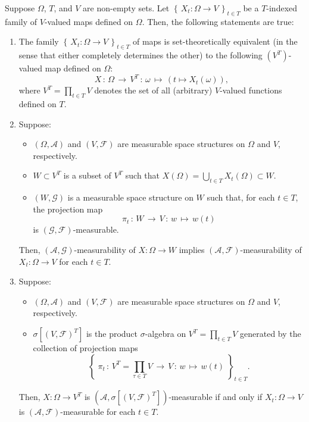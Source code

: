 \begin{theorem}
\mbox{}\vskip 0.1cm
\noindent
Suppose $\Omega$, $T$, and $V$ are non-empty sets.
Let $\left\{\,X_{t} : \Omega \longrightarrow V \,\right\}_{t \in T}$
be a $T$-indexed family of $V$-valued maps defined on $\Omega$.
Then, the following statements are true:
\begin{enumerate}
\item	The family $\left\{\,X_{t} : \Omega \longrightarrow V \,\right\}_{t \in T}$
		of maps is set-theoretically equivalent (in the sense that either completely determines the other)
		to the following $(V^{T})$-valued map defined on $\Omega$:
		\begin{equation*}
		X \,:\, \Omega \,\longrightarrow\, V^{T} \,:\, \omega \,\longmapsto\, \left(t \longmapsto X_{t}(\omega)\right),
		\end{equation*}
		where $V^{T} = \prod_{t\in T}V$ denotes the set of all (arbitrary) $V$-valued functions defined on $T$.
\item	Suppose:
		\begin{itemize}
		\item $\left(\Omega,\mathcal{A}\right)$ and $\left(V,\mathcal{F}\right)$
			are measurable space structures on $\Omega$ and $V$, respectively.
		\item $W \subset V^{T}$ is a subset of $V^{T}$
			such that $X(\Omega) = \bigcup_{t \in T}X_{t}(\Omega) \subset W$.
		\item $\left(W,\mathcal{G}\right)$ is a measurable space structure on $W$
			such that, for each $t \in T$, the projection map
			\begin{equation*}
			\pi_{t} \,:\, W \,\longrightarrow\, V \,:\, w \,\longmapsto\, w(t)
			\end{equation*}
			is $\left(\mathcal{G},\mathcal{F}\right)$-measurable.
		\end{itemize}
		Then, $\left(\mathcal{A},\mathcal{G}\right)$-measurability of $X : \Omega \longrightarrow W$
		implies
		$(\mathcal{A},\mathcal{F})$-measurability of $X_{t} : \Omega \longrightarrow V$ for each $t \in T$.
\item	Suppose:
		\begin{itemize}
		\item $\left(\Omega,\mathcal{A}\right)$ and $\left(V,\mathcal{F}\right)$
			are measurable space structures on $\Omega$ and $V$, respectively.
		\item $\sigma[\left(V,\mathcal{F}\right)^{T}]$ is the product $\sigma$-algebra
			on $V^{T} = \prod_{t \in T}V$ generated by the collection of projection maps
			\begin{equation*}
			\left\{\;
			\pi_{t} \,:\, V^{T} = \prod_{\tau \in T}V \,\longrightarrow\, V \,:\, w \,\longmapsto\, w(t)
			\;\right\}_{t \in T}.
			\end{equation*}
		\end{itemize}
		Then, $X : \Omega \longrightarrow V^{T}$ is
		$\left(\mathcal{A},\sigma[\left(V,\mathcal{F}\right)^{T}]\right)$-measurable
		if and only if
		$X_{t} : \Omega \longrightarrow V$ is $(\mathcal{A},\mathcal{F})$-measurable for each $t \in T$.
\end{enumerate}
\end{theorem}

